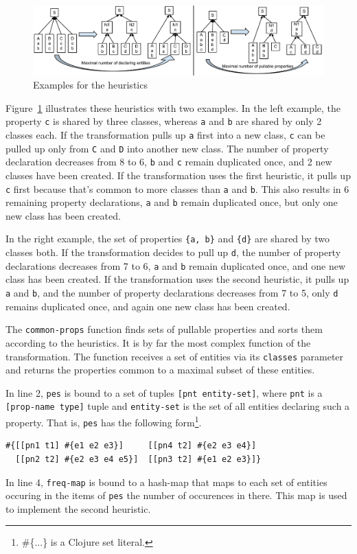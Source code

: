 \documentclass[submission]{eptcs}
\begin{document}
\begin{figure}[h!tb]
  \centering
  \includegraphics[width=\linewidth]{heuristics-example}
  \caption{Examples for the heuristics}
  \label{fig:heuristics-example}
\end{figure}

Figure~\ref{fig:heuristics-example} illustrates these heuristics with two
examples.  In the left example, the property \verb|c| is shared by three
classes, whereas \verb|a| and \verb|b| are shared by only 2 classes each.  If
the transformation pulls up \verb|a| first into a new class, \verb|c| can be
pulled up only from \verb|C| and \verb|D| into another new class.  The number
of property declaration decreases from 8 to 6, \verb|b| and \verb|c| remain
duplicated once, and 2 new classes have been created.  If the transformation
uses the first heuristic, it pulls up \verb|c| first because that's common to
more classes than \verb|a| and \verb|b|.  This also results in 6 remaining
property declarations, \verb|a| and \verb|b| remain duplicated once, but only
one new class has been created.

In the right example, the set of properties \verb|{a, b}| and \verb|{d}| are
shared by two classes both.  If the transformation decides to pull up \verb|d|,
the number of property declarations decreases from 7 to 6, \verb|a| and
\verb|b| remain duplicated once, and one new class has been created.  If the
transformation uses the second heuristic, it pulls up \verb|a| and \verb|b|,
and the number of property declarations decreases from 7 to 5, only \verb|d|
remains duplicated once, and again one new class has been created.

The \verb|common-props| function finds sets of pullable properties and sorts
them according to the heuristics.  It is by far the most complex function of
the transformation.  The function receives a set of entities via its
\verb|classes| parameter and returns the properties common to a maximal subset
of these entities.

In line 2, \verb|pes| is bound to a set of tuples \verb|[pnt entity-set]|,
where \verb|pnt| is a \verb|[prop-name type]| tuple and \verb|entity-set| is
the set of all entities declaring such a property.  That is, \verb|pes| has the
following form\footnote{\textsf{\#\{...\} is a Clojure set literal.}}.
\begin{Verbatim}[fontsize=\footnotesize]
#{[[pn1 t1] #{e1 e2 e3}]     [[pn4 t2] #{e2 e3 e4}]
  [[pn2 t2] #{e2 e3 e4 e5}]  [[pn3 t2] #{e1 e2 e3}]}
\end{Verbatim}
In line 4, \verb|freq-map| is bound to a hash-map that maps to each set of
entities occuring in the items of \verb|pes| the number of occurences in there.
This map is used to implement the second heuristic.
\end{document}
